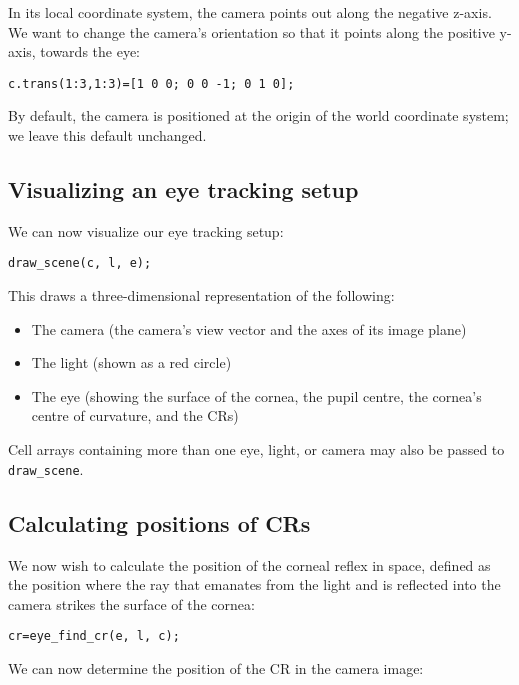 \documentclass{scrartcl}
\begin{document}
In its local coordinate system, the camera points out along the negative
z-axis. We want to change the camera's orientation so that it points along the
positive y-axis, towards the eye:

\begin{verbatim}
c.trans(1:3,1:3)=[1 0 0; 0 0 -1; 0 1 0];
\end{verbatim}

By default, the camera is positioned at the origin of the world coordinate
system; we leave this default unchanged.

\subsection*{Visualizing an eye tracking setup}

We can now visualize our eye tracking setup:

\begin{verbatim}
draw_scene(c, l, e);
\end{verbatim}

This draws a three-dimensional representation of the following:

\begin{itemize}
\item The camera (the camera's view vector and the axes of its image plane)

\item The light (shown as a red circle)

\item The eye (showing the surface of the cornea, the pupil centre, the
cornea's centre of curvature, and the CRs)
\end{itemize}

Cell arrays containing more than one eye, light, or camera may also be passed
to \texttt{draw\_scene}.

\subsection*{Calculating positions of CRs}

We now wish to calculate the position of the corneal reflex in space, defined
as the position where the ray that emanates from the light and is reflected
into the camera strikes the surface of the cornea:

\begin{verbatim}
cr=eye_find_cr(e, l, c);
\end{verbatim}

We can now determine the position of the CR in the camera image:
\end{document}
